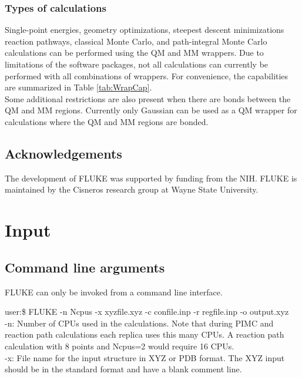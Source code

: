 \documentclass[12pt]{report}
\begin{document}
\subsection{Types of calculations}

Single-point energies, geometry optimizations, steepest descent minimizations
reaction pathways, classical Monte Carlo, and path-integral Monte Carlo
calculations can be performed using the QM and MM wrappers. Due to limitations
of the software packages, not all calculations can currently be performed with
all combinations of wrappers. For convenience, the capabilities are summarized
in Table \ref{tab:WrapCap}. \\

Some additional restrictions are also present when there are bonds between
the QM and MM regions. Currently only Gaussian can be used as a QM wrapper
for calculations where the QM and MM regions are bonded.

\FloatBarrier

\section{Acknowledgements}

The development of FLUKE was supported by funding from the NIH. FLUKE is
maintained by the Cisneros research group at Wayne State University.

\chapter{Input}

\section{Command line arguments}

FLUKE can only be invoked from a command line interface.

user:\$ FLUKE -n Ncpus -x xyzfile.xyz -c confile.inp
 -r regfile.inp -o output.xyz \\

-n: Number of CPUs used in the calculations. Note that during PIMC and
reaction path calculations each replica uses this many CPUs. A reaction
path calculation with 8 points and Ncpus=2 would require 16 CPUs. \\

-x: File name for the input structure in XYZ or PDB format. The XYZ input
should be in the standard format and have a blank comment line. \\
\end{document}
